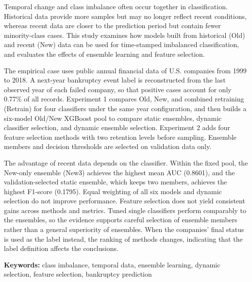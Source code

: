 Temporal change and class imbalance often occur together in classification. Historical data provide more samples but may no longer reflect recent conditions, whereas recent data are closer to the prediction period but contain fewer minority-class cases. This study examines how models built from historical (Old) and recent (New) data can be used for time-stamped imbalanced classification, and evaluates the effects of ensemble learning and feature selection.

The empirical case uses public annual financial data of U.S. companies from 1999 to 2018. A next-year bankruptcy event label is reconstructed from the last observed year of each failed company, so that positive cases account for only 0.77\% of all records. Experiment 1 compares Old, New, and combined retraining (Retrain) for four classifiers under the same year configuration, and then builds a six-model Old/New XGBoost pool to compare static ensembles, dynamic classifier selection, and dynamic ensemble selection. Experiment 2 adds four feature selection methods with two retention levels before sampling. Ensemble members and decision thresholds are selected on validation data only.

The advantage of recent data depends on the classifier. Within the fixed pool, the New-only ensemble (New3) achieves the highest mean AUC (0.8601), and the validation-selected static ensemble, which keeps two members, achieves the highest F1-score (0.1795). Equal weighting of all six models and dynamic selection do not improve performance. Feature selection does not yield consistent gains across methods and metrics. Tuned single classifiers perform comparably to the ensembles, so the evidence supports careful selection of ensemble members rather than a general superiority of ensembles. When the companies' final status is used as the label instead, the ranking of methods changes, indicating that the label definition affects the conclusions.

\noindent\textbf{Keywords:} class imbalance, temporal data, ensemble learning, dynamic selection, feature selection, bankruptcy prediction
